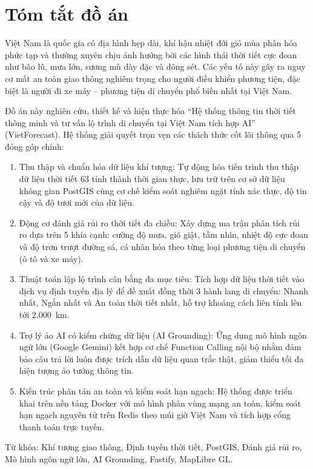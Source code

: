 \chapter*{Tóm tắt đồ án}

Việt Nam là quốc gia có địa hình hẹp dài, khí hậu nhiệt đới gió mùa phân hóa phức tạp và thường xuyên chịu ảnh hưởng bởi các hình thái thời tiết cực đoan như bão lũ, mưa lớn, sương mù dày đặc và dông sét. Các yếu tố này gây ra nguy cơ mất an toàn giao thông nghiêm trọng cho người điều khiển phương tiện, đặc biệt là người đi xe máy -- phương tiện di chuyển phổ biến nhất tại Việt Nam.

Đồ án này nghiên cứu, thiết kế và hiện thực hóa “Hệ thống thông tin thời tiết thông minh và tư vấn lộ trình di chuyển tại Việt Nam tích hợp AI” (VietForecast). Hệ thống giải quyết trọn vẹn các thách thức cốt lõi thông qua 5 đóng góp chính:
\begin{enumerate}
    \item Thu thập và chuẩn hóa dữ liệu khí tượng: Tự động hóa tiến trình thu thập dữ liệu thời tiết 63 tỉnh thành thời gian thực, lưu trữ trên cơ sở dữ liệu không gian PostGIS cùng cơ chế kiểm soát nghiêm ngặt tính xác thực, độ tin cậy và độ tươi mới của dữ liệu.
    \item Động cơ đánh giá rủi ro thời tiết đa chiều: Xây dựng ma trận phân tích rủi ro dựa trên 5 khía cạnh: cường độ mưa, gió giật, tầm nhìn, nhiệt độ cực đoan và độ trơn trượt đường sá, cá nhân hóa theo từng loại phương tiện di chuyển (ô tô và xe máy).
    \item Thuật toán lập lộ trình cân bằng đa mục tiêu: Tích hợp dữ liệu thời tiết vào dịch vụ định tuyến địa lý để đề xuất đồng thời 3 hành lang di chuyển: Nhanh nhất, Ngắn nhất và An toàn thời tiết nhất, hỗ trợ khoảng cách liên tỉnh lên tới 2.000~km.
    \item Trợ lý ảo AI có kiểm chứng dữ liệu (AI Grounding): Ứng dụng mô hình ngôn ngữ lớn (Google Gemini) kết hợp cơ chế Function Calling nội bộ nhằm đảm bảo câu trả lời luôn được trích dẫn dữ liệu quan trắc thật, giảm thiểu tối đa hiện tượng ảo tưởng thông tin.
    \item Kiến trúc phân tán an toàn và kiểm soát hạn ngạch: Hệ thống được triển khai trên nền tảng Docker với mô hình phân vùng mạng an toàn, kiểm soát hạn ngạch nguyên tử trên Redis theo múi giờ Việt Nam và tích hợp cổng thanh toán trực tuyến.
\end{enumerate}

\vspace{0.5cm}
\noindent Từ khóa: Khí tượng giao thông, Định tuyến thời tiết, PostGIS, Đánh giá rủi ro, Mô hình ngôn ngữ lớn, AI Grounding, Fastify, MapLibre GL.
